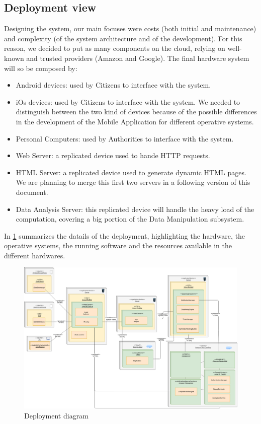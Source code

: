 \documentclass{article}
\begin{document}
	\subsection{Deployment view} 
	Designing the system, our main focuses were costs (both initial and maintenance) and complexity (of the system architecture and of the development).
	For this reason, we decided to put as many components on the cloud, relying on well-known and trusted providers (Amazon and Google). The final hardware system will so be composed by:
	\begin{itemize}
		\item Android devices: used by Citizens to interface with the system.
		\item iOs devices: used by Citizens to interface with the system. We needed to distinguish between the two kind of devices because of the possible differences in the development of the Mobile Application for different operative systems.
		\item Personal Computers: used by Authorities to interface with the system.
		\item Web Server: a replicated device used to hande HTTP requests.
		\item HTML Server: a replicated device used to generate dynamic HTML pages. We are planning to merge this first two servers in a following version of this document.
		\item Data Analysis Server: this replicated device will handle the heavy load of the computation, covering a big portion of the Data Manipulation subsystem.
	\end{itemize}
	In \cref{fig:Deployment} summarizes the datails of the deployment, highlighting the hardware, the operative systems, the running software and the resources available in the different hardwares.
	\begin{figure}[h]
		\includegraphics[width=\linewidth]{images/Deployment_diagram.png}
		\caption{Deployment diagram}
		\label{fig:Deployment}
	\end{figure}
	\newpage \FloatBarrier
\end{document}
